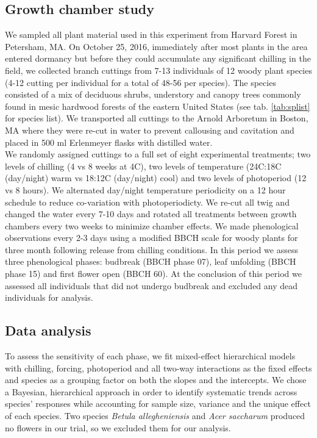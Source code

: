 \documentclass[11pt]{article}
\begin{document}
\subsection*{Growth chamber study}
\noindent We sampled all plant material used in this experiment from Harvard Forest in Petersham, MA. On October 25, 2016, immediately after most plants in the area entered dormancy but before they could accumulate any significant chilling in the field,  we collected branch cuttings from 7-13 individuals of 12 woody plant species (4-12 cutting per individual for a total of 48-56 per species). The species consisted of a mix of deciduous shrubs, understory and canopy trees commonly found in mesic hardwood forests of the eastern United States (see tab. \ref{tab:splist} for species list). We transported all cuttings to the Arnold Arboretum in Boston, MA where they were re-cut in water to prevent callousing and cavitation and placed in 500 ml Erlenmeyer flasks with distilled water.\\ 

\noindent We randomly assigned cuttings to a full set of eight experimental treatments; two levels of chilling (4 vs 8 weeks at 4\degree C), two levels of temperature (24\degree C:18\degree C (day/night) warm vs 18\degree:12\degree C (day/night) cool) and two levels of photoperiod (12 vs 8 hours). We alternated day/night temperature periodicity on a 12 hour schedule to reduce co-variation with photoperiodicty. We re-cut all twig and changed the water every 7-10 days and rotated all treatments between growth chambers every two weeks to minimize chamber effects. We made phenological observations every 2-3 days using a modified BBCH scale for woody plants \citep{Finn2007} for three month following release from chilling conditions. In this period we assess three phenological phases: budbreak (BBCH phase 07), leaf unfolding (BBCH phase 15) and first flower open (BBCH 60). At the conclusion of this period we assessed all individuals that did not undergo budbreak and excluded any dead individuals for analysis.

\subsection*{Data analysis}
\noindent To assess the sensitivity of each phase, we fit mixed-effect hierarchical models with chilling, forcing, photoperiod and all two-way interactions as the fixed effects and species as a grouping factor on both the slopes and the intercepts. We chose a Bayesian, hierarchical approach in order to identify systematic trends across species' responses while accounting for sample size, variance and the unique effect of each species. Two species \textit{Betula allegheniensis} and \textit{Acer saccharum} produced no flowers in our trial, so we excluded them for our analysis.\\
\end{document}
